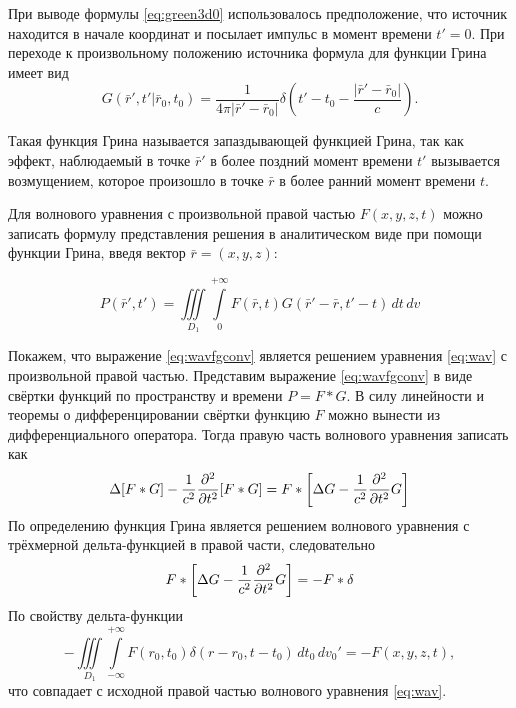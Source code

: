 \documentclass[a4paper, fontsize=14pt]{article}
\begin{document}
При выводе формулы \eqref{eq:green3d0} использовалось предположение,  что источник находится в начале координат  и посылает импульс в момент времени $t' = 0$. При переходе к произвольному положению источника 
формула для функции Грина имеет вид
\begin{equation}
	G(\bar{r}',t'|\bar{r}_0,t_0)= \frac{1}{4\pi|\bar{r}'-\bar{r}_0|}
	\delta\left(t'-t_0-\frac{|\bar{r}'-\bar{r}_0|}{c}\right).
\label{eq:green3d}
\end{equation}

	Такая функция Грина называется запаздывающей функцией Грина, так как эффект,
	наблюдаемый в точке $\bar{r}'$ в более поздний момент времени $t'$ вызывается
	возмущением,
	которое произошло в точке $\bar{r}$ в более ранний момент времени $t$.

	
	Для волнового уравнения с произвольной правой частью $F(x,y,z,t)$ можно
	записать формулу представления решения 
	в аналитическом виде при помощи функции Грина, введя вектор $\bar{r} = (x,y,z)$: \cite{vladimirov}
	
	
	
	\begin{equation}
		P(\bar{r}',t')=\iiint\limits_{D_1} \int\limits_{0}^{+\infty}
		F(\bar{r},t) G(\bar{r}' - \bar{r},t'- t)\,dt\,dv
		\label{eq:wavfgconv}
	\end{equation}
	
	Покажем, что выражение \eqref{eq:wavfgconv} является решением уравнения \eqref{eq:wav} с произвольной правой частью.
	Представим выражение \eqref{eq:wavfgconv} в виде свёртки функций по пространству и времени $P = F*G$. В силу линейности  и теоремы о дифференцировании свёртки функцию $F$ можно вынести из дифференциального оператора.
	Тогда правую часть волнового уравнения записать как 
	\begin{equation}
		\Delta [F*G] -\frac{1}{c^2} \diff[2]{}{t} [F*G] = F*\left[\Delta G -\frac{1}{c^2} \diff[2]{}{t} 
		G\right] 
	\end{equation}
	По определению функция Грина является решением волнового уравнения с трёхмерной дельта-функцией в правой части, следовательно
	\begin{equation*}
		F*\left[\Delta G -\frac{1}{c^2} \diff[2]{}{t} G\right] = -F * \delta
	\end{equation*}
	По свойству дельта-функции 
	\begin{equation}
		-\iiint\limits_{D_1} \int\limits_{-\infty}^{+\infty}
		F(r_0,t_0) \delta({r} - {r}_0,t- t_0)\,dt_0\,dv_0' = -F(x,y,z,t),
	\end{equation}
	что совпадает с исходной правой частью волнового уравнения   \eqref{eq:wav}.
	
\end{document}
